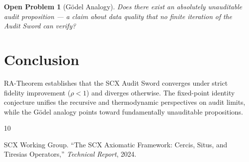 \documentclass[12pt,a4paper]{article}
\newtheorem{openproblem}[theorem]{Open Problem}
\begin{document}
\begin{openproblem}[G\"odel Analogy]
\label{prob:godel}
Does there exist an absolutely unauditable audit proposition --- a claim about data quality that no finite iteration of the Audit Sword can verify?
\end{openproblem}

\section{Conclusion}

RA-Theorem establishes that the \textsf{SCX} Audit Sword converges under strict fidelity improvement ($\rho<1$) and diverges otherwise. The fixed-point identity conjecture unifies the recursive and thermodynamic perspectives on audit limits, while the G\"odel analogy points toward fundamentally unauditable propositions.


\begin{thebibliography}{10}

SCX Working Group.
\newblock ``The \textsf{SCX} Axiomatic Framework: Cercis, Situs, and Tiresias Operators,''
\newblock \emph{Technical Report}, 2024.

\end{thebibliography}
\end{document}
